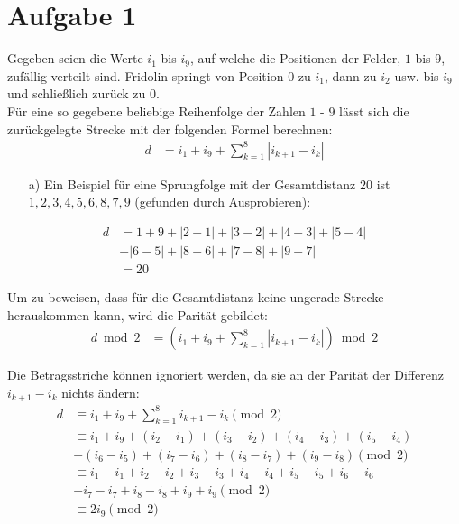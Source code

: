 \documentclass[12pt,a4paper,oneside]{article}
\begin{document}
\pagestyle{fancy}
\fancyhead[L]{\thepage}
\fancyfoot[]{}

\section[]{Aufgabe 1}
\setlength{\mathindent}{2cm}

Gegeben seien die Werte $i_1$ bis $i_9$, auf welche die Positionen der Felder, $1$ bis $9$, zufällig verteilt sind.
Fridolin springt von Position $0$ zu $i_1$, dann zu $i_2$ usw. bis $i_9$ und schließlich zurück zu $0$. \\[10pt]
Für eine so gegebene beliebige Reihenfolge der Zahlen $1$ - $9$ lässt sich die zurückgelegte Strecke mit der folgenden Formel berechnen:
\begin{align*}
	d &= i_1 + i_9 + \sum_{k=1}^{8} |i_{k+1} - i_k|
\end{align*}
\begin{itemize}
	\item[a)] Ein Beispiel für eine Sprungfolge mit der Gesamtdistanz $20$ ist \\
	$1, 2, 3, 4, 5, 6, 8, 7, 9$ (gefunden durch Ausprobieren):
\end{itemize}
\begin{align*}
	d &= 1 + 9 + |2-1|+|3-2|+|4-3|+|5-4| \\
	&+ |6-5|+|8-6|+|7-8|+|9-7| \\
	&= 20
\end{align*}

Um zu beweisen, dass für die Gesamtdistanz keine ungerade Strecke herauskommen kann, wird die Parität gebildet:
\begin{align*}
	d \bmod 2 &= \left(i_1 + i_9 + \sum_{k=1}^{8} |i_{k+1} - i_k|\right) \bmod 2
\end{align*}

Die Betragsstriche können ignoriert werden, da sie an der Parität der Differenz $i_{k+1}-i_k$ nichts ändern:
\begin{align*}
	d &\equiv i_1 + i_9 + \sum_{k=1}^{8} i_{k+1} - i_k \pmod 2 \\
	&\equiv i_1 + i_9 + (i_2 - i_1) + (i_3 - i_2) + (i_4 - i_3) + (i_5 - i_4) \\
	&+ (i_6 - i_5) + (i_7 - i_6) + (i_8 - i_7) + (i_9 - i_8) \pmod 2 \\[7pt]
	&\equiv i_1 - i_1 + i_2 - i_2 + i_3 - i_3 + i_4 - i_4 + i_5 - i_5 + i_6 - i_6 \\
	&+ i_7 - i_7 + i_8 - i_8 + i_9 + i_9 \pmod 2 \\[7pt]
	&\equiv 2 i_9 \pmod 2
\end{align*}
\end{document}
